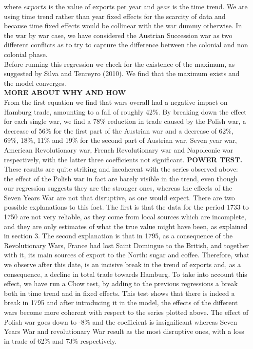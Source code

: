 \documentclass[12pt,a4paper,titlepage,english]{article}
\begin{document}
where $exports$  is the value of exports per year and  $year$ is the time trend. We are using time trend rather than year fixed effects for the scarcity of data and because time fixed effects would be collinear with the war dummy otherwise.
In the war by war case, we have considered the Austrian Succession war as two different conflicts as to try to capture the difference between the colonial and non colonial phase.\\
Before running this regression we check for the existence of the maximum, as suggested by Silva and Tenreyro (2010). We find that the maximum exists and the model converges. \\
\textbf{ MORE ABOUT WHY AND HOW} \\
From the first equation we find that wars overall had a negative impact on Hamburg trade, amounting to a fall of roughly 42\%. By breaking down the effect for each single war, we find a 78\% reduction in trade caused by the Polish war, a decrease of 56\% for the first part of the Austrian war and a decrease of 62\%, 69\%, 18\%, 11\% and 19\% for the second part of Austrian war, Seven year war, American Revolutionary war, French Revolutionary war and Napoleonic war respectively, with the latter three coefficients not significant. \textbf{ POWER TEST.} These results are quite striking and incoherent with the series observed above: the effect of the Polish war in fact are barely visible in the trend, even though our regression suggests they are the stronger ones, whereas the effects of the Seven Years War are not that disruptive, as one would expect. There are two possible explanations to this fact. The first is that the data for the period 1733 to 1750 are not very reliable, as they come from local sources which are incomplete, and they are only estimates of what the true value might have been, as explained in section 3. The second explanation is that in 1795, as a consequence of the Revolutionary Wars, France had lost Saint Domingue to the British, and together with it, its main sources of export to the North: sugar and coffee. Therefore, what we observe after this date, is an incisive break in the trend of exports and, as a consequence, a decline in total trade towards Hamburg. To take into account this effect, we have run a Chow test, by adding to the previous regressions a break both in time trend and in fixed effects. This test shows that there is indeed a break in 1795 and after introducing it in the model, the effects of the different wars become more coherent with respect to the series plotted above. The effect of Polish war goes down to -8\% and the coefficient is insignificant whereas Seven Years War and revolutionary War result as the most disruptive ones, with a loss in trade of 62\% and 73\% respectively. 
\end{document}
